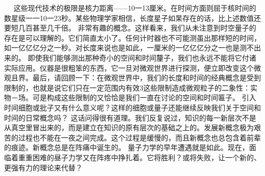   
这些现代技术的极限是核力距离——10一13厘米。在时间方面则屈于核时间的数星级一一10一23秒。某些物理学家相信，长度星子如杲存在的话，比上述数值还要短几百甚至几千倍。
非常有趣的概念。这样看来，我们从未注意到时空量子的存在是可以理解的。它们简直太小了。任何计时器也不可能测虽出那样短的时间，如一亿亿亿分之一秒。对长度来说也是如此，一厘米的一亿亿亿分之一也是测不出来的。
即使我们能够测出那种奇小的空间和时间釐子，我们也永远不能将它付诸实际应用。仪器是很粗笨的东西，它一旦对微观世界进行探测，便立即改变这个微观且界。最后，请回顾一下：在微观世界中，我们的长度和时间的经典概念是受到限制的，也就是说它们只在一定范围内有效3这些限制造成微观粒子的二象性：实物－场。可是构成这些限制的又恰恰是我们一直在讨论的空间和时间匾子。
引入时间细胞或批子又有什么意义呢？这样的细胞或量子还能继续反映我们关于空间和时间的日常概念吗？
这话问得很有道理。我们反复说过，知识的每一新层次不是从真空里冒出来的，而是建立在知识的原有层次的基础之上的。发展新概念极为艰苦的过程也不能在一夜之间完成。这个过程是缓慢的，而且新概念也总包含着前辈的痕迹。新概念总是在阵痛中诞生的。
量子力学的早年遭遇就是如此。现在，面临着重重困难的昼子力学又在阵疼中挣扎着。它将胜利？或将失败，让一个新的、更强有力的理论来代替？
